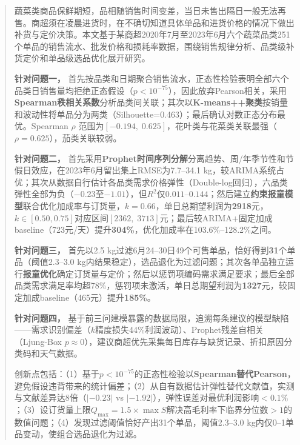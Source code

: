 
\begin{abstract}

  蔬菜类商品保鲜期短，品相随销售时间变差，当日未售出隔日一般无法再售。商超须在凌晨进货时，在不确切知道具体单品和进货价格的情况下做出补货与定价决策。本文基于某商超2020年7月至2023年6月六个蔬菜品类251个单品的销售流水、批发价格和损耗率数据，围绕销售规律分析、品类级补货定价和单品级选品优化展开研究。

  \textbf{针对问题一，} 首先按品类和日期聚合销售流水，正态性检验表明全部六个品类日销售量均拒绝正态假设（$p<10^{-75}$），因此放弃Pearson相关，采用\textbf{Spearman秩相关系数}分析品类间关联；其次以\textbf{K-means++聚类}按销量和波动性将单品分为两类（Silhouette=0.463）；最后确认对数正态分布最优。Spearman $\rho$ 范围为$[-0.194,\;0.625]$，花叶类与花菜类关联最强（$\rho=0.625$），茄类关联较弱。

  \textbf{针对问题二，} 首先采用\textbf{Prophet时间序列分解}分离趋势、周/年季节性和节假日效应，在2023年6月留出集上RMSE为7.7--34.1 kg，较ARIMA系统占优；其次从数据自行估计各品类需求价格弹性（Double-log回归），六品类弹性全部为负（$-0.23$至$-1.01$），但$R^2$仅$0.011$--$0.144$；然后建立\textbf{约束报童模型}联合优化加成率与订货量，$k=0.66$，单日总期望利润为\textbf{2918}元，$k\in[0.50,0.75]$对应区间$[2362,\;3713]$元；最后较ARIMA+固定加成baseline（723元/天）提升\textbf{304\%}，优化加成率在103.6\%--128.2\%之间。

  \textbf{针对问题三，} 首先以2.5 kg过滤6月24--30日49个可售单品，恰好得到\textbf{31}个单品（阈值2.3--3.0 kg内结果稳定），选品退化为过滤问题；其次各单品独立运行\textbf{报童优化}确定订货量与定价；然后以惩罚项编码需求满足要求；最后全部品类需求满足率均超78\%，惩罚项未激活，单日总期望利润为\textbf{1327}元，较固定加成baseline（465元）提升\textbf{185\%}。

  \textbf{针对问题四，} 基于前三问建模暴露的数据局限，追溯每条建议的模型缺陷——需求识别偏差（$k$精度损失44\%利润波动）、Prophet残差自相关（Ljung-Box $p\approx 0$），建议商超优先采集每日库存与缺货记录、折扣原因分类码和天气数据。

  创新点包括：（1）基于$p<10^{-75}$的正态性检验以\textbf{Spearman替代Pearson}，避免假设违背带来的统计偏差；（2）从自有数据估计弹性替代文献值，实测与文献\cite{Nie2024}差异达8倍（$|-0.23|$ vs $|-1.92|$），弹性误差对最优利润影响$<0.1\%$；（3）设订货量上限$Q_{\max}=1.5\times\max S$解决高毛利率下临界分位数$>1$的数值问题；（4）发现过滤阈值恰好产出31个单品，阈值2.3--3.0 kg内仅0--1单品变动，使组合选品退化为过滤。


\end{abstract}
